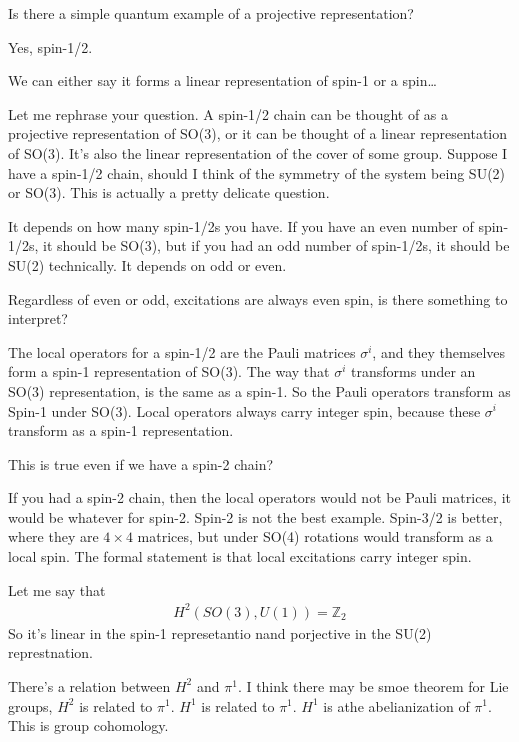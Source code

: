 \begin{question}
    Is there a simple quantum example of a projective representation?
\end{question}
Yes, spin-1/2.

\begin{question}
    We can either say it forms a linear representation of spin-1
    or a spin\ldots
\end{question}
Let me rephrase your question.
A spin-1/2 chain can be thought of as a projective representation of SO(3),
or it can be thought of a linear representation of SO(3).
It's also the linear representation of the cover of some group.
Suppose I have a spin-1/2 chain,
should I think of the symmetry of the system being SU(2) or SO(3).
This is actually a pretty delicate question.

It depends on how many spin-1/2s you have.
If you have an even number of spin-1/2s, it should be SO(3),
but if you had an odd number of spin-1/2s, it should be SU(2) technically.
It depends on odd or even.

\begin{question}
    Regardless of even or odd,
    excitations are always even spin,
    is there something to interpret?
\end{question}
The local operators for a spin-1/2 are the Pauli matrices $\sigma^i$,
and they themselves form a spin-1 representation of SO(3).
The way that $\sigma^i$ transforms under an SO(3) representation,
is the same as a spin-1.
So the Pauli operators transform as Spin-1 under SO(3).
Local operators always carry integer spin,
because these $\sigma^i$ transform as a spin-1 representation.

\begin{question}
    This is true even if we have a spin-2 chain?
\end{question}
If you had a spin-2 chain,
then the local operators would not be Pauli matrices,
it would be whatever for spin-2.
Spin-2 is not the best example.
Spin-3/2 is better,
where they are $4\times 4$ matrices,
but under SO(4) rotations would transform as a local spin.
The formal statement is that local excitations carry integer spin.

Let me say that
\begin{align}
    H^2(SO(3), U(1)) = \mathbb{Z}_2
\end{align}
So it's linear in the spin-1 represetantio nand porjective in the SU(2)
represtnation.

There's a relation between $H^2$ and $\pi^1$.
I think there may be smoe theorem for Lie groups,
$H^2$ is related to $\pi^1$.
$H^1$ is related to $\pi^1$.
$H^1$ is athe abelianization of $\pi^1$.
This is group cohomology.

